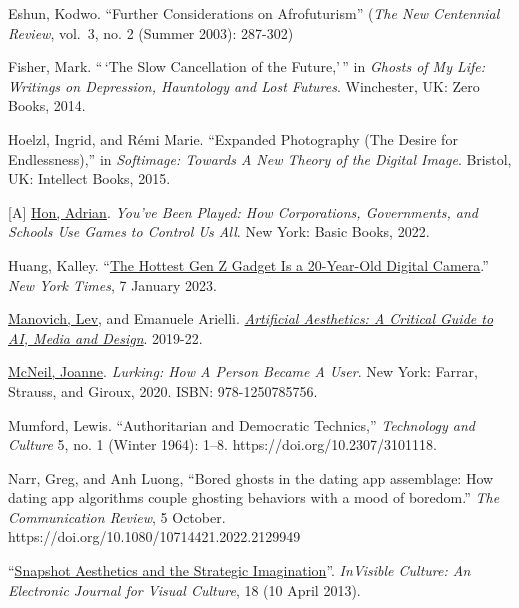 \documentclass[
  letterpaper,
  DIV=11,
  numbers=noendperiod]{scrartcl}
\begin{document}
Eshun, Kodwo. ``Further Considerations on Afrofuturism'' (\emph{The New
Centennial Review}, vol.~3, no. 2 (Summer 2003): 287-302)

Fisher, Mark. ``\,`The Slow Cancellation of the Future,'\,'' in
\emph{Ghosts of My Life: Writings on Depression, Hauntology and Lost
Futures}. Winchester, UK: Zero Books, 2014.

Hoelzl, Ingrid, and Rémi Marie. ``Expanded Photography (The Desire for
Endlessness),'' in \emph{Softimage: Towards A New Theory of the Digital
Image}. Bristol, UK: Intellect Books, 2015.

{[}A{]} \href{https://mssv.net/}{Hon, Adrian}. \emph{You've Been Played:
How Corporations, Governments, and Schools Use Games to Control Us All}.
New York: Basic Books, 2022.

Huang, Kalley.
``\href{https://www.nytimes.com/2023/01/07/technology/digital-cameras-olympus-canon.html?fbclid=IwAR1X2DutHJgtJFKB6XdcFjbm3kFB9P-IXPT7HckeGErsOrk0jTVGxugXYzk\&referringSource=articleShare\&smid=nytcore-ios-share\&unlocked_article_code=AAAAAAAAAAAAAAAACEIPuonUktbfqIhkSVUbBCbJUNMnqBqCgvfeh7A9iX7iJSzQQj9Hwv4cGM2H_1bIfbd4ItA62TOdAt9dNbtlDNpD8thiBW0_AQ-5vsnD350fPyQ-rY_0Dm9qhMvBUL59-jTjPizkd7wmgezgtErDOzbvUaLc2CB2LF1isoIlIQ_xoQEAxqjPGuB009hsj7x2Vt0hG2B2NGTdtOLoCh5_JNyFchjZjwE8UOhdUjzQ9sWOv_NCKE4BTAKbEw4spDo0-9heO9kIPa7gLBZGeMv2gLoZD2cAP55OPFabG3prPPkN94E3_vHG}{The
Hottest Gen Z Gadget Is a 20-Year-Old Digital Camera}.'' \emph{New York
Times}, 7 January 2023.

\href{https://manovich.net/}{Manovich, Lev}, and Emanuele Arielli.
\href{http://manovich.net/index.php/projects/artificial-aesthetics-book}{\emph{Artificial
Aesthetics: A Critical Guide to AI, Media and Design}}. 2019-22.

\href{https://joannemcneil.com/}{McNeil, Joanne}. \emph{Lurking: How A
Person Became A User}. New York: Farrar, Strauss, and Giroux, 2020.
ISBN: 978-1250785756.

Mumford, Lewis. ``Authoritarian and Democratic Technics,''
\emph{Technology and Culture} 5, no. 1 (Winter 1964): 1--8.
https://doi.org/10.2307/3101118.

Narr, Greg, and Anh Luong, ``Bored ghosts in the dating app assemblage:
How dating app algorithms couple ghosting behaviors with a mood of
boredom.'' \emph{The Communication Review}, 5 October.
https://doi.org/10.1080/10714421.2022.2129949

``\href{http://ivc.lib.rochester.edu/snapshot-aesthetics-and-the-strategic-imagination/}{Snapshot
Aesthetics and the Strategic Imagination}''. \emph{InVisible Culture: An
Electronic Journal for Visual Culture}, 18 (10 April 2013).
\end{document}

